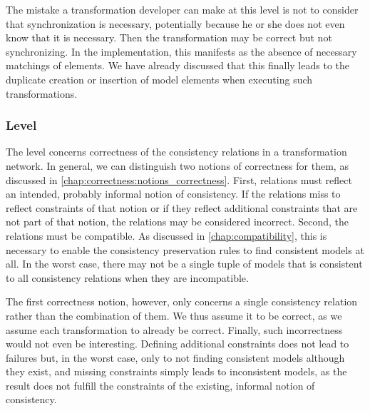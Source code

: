The mistake a transformation developer can make at this level is not to consider that synchronization is necessary, potentially because he or she does not even know that it is necessary. Then the transformation may be correct but not synchronizing.
In the implementation, this manifests as the absence of necessary matchings of elements.
We have already discussed that this finally leads to the duplicate creation or insertion of model elements when executing such transformations.


\subsubsection*{\LevelNetworkRelation Level}

The \levelnetworkrelation level concerns correctness of the consistency relations in a transformation network.
In general, we can distinguish two notions of correctness for them, as discussed in \autoref{chap:correctness:notions_correctness}.
First, relations must reflect an intended, probably informal notion of consistency.
If the relations miss to reflect constraints of that notion or if they reflect additional constraints that are not part of that notion, the relations may be considered incorrect.
Second, the relations must be compatible.
As discussed in \autoref{chap:compatibility}, this is necessary to enable the consistency preservation rules to find consistent models at all.
In the worst case, there may not be a single tuple of models that is consistent to all consistency relations when they are incompatible.

The first correctness notion, however, only concerns a single consistency relation rather than the combination of them.
We thus assume it to be correct, as we assume each transformation to already be correct.
Finally, such incorrectness would not even be interesting.
Defining additional constraints does not lead to failures but, in the worst case, only to not finding consistent models although they exist, and missing constraints simply leads to inconsistent models, as the result does not fulfill the constraints of the existing, informal notion of consistency.

